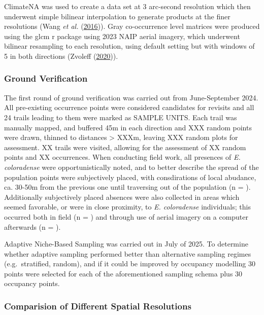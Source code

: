 \documentclass[
]{article}
\begin{document}
ClimateNA was used to create a data set at 3 arc-second resolution which
then underwent simple bilinear interpolation to generate products at the
finer resolutions (Wang \emph{et al.}
(\protect\hyperlink{ref-wang2016locally}{2016})). Gray co-occurrence
level matrices were produced using the glcm r package using 2023 NAIP
aerial imagery, which underwent bilinear resampling to each resolution,
using default setting but with windows of 5 in both directions (Zvoleff
(\protect\hyperlink{ref-zvoleff2020glcm}{2020})).

\hypertarget{ground-verification}{%
\subsubsection{Ground Verification}\label{ground-verification}}

The first round of ground verification was carried out from
June-September 2024. All pre-existing occurrence points were considered
candidates for revisits and all 24 trails leading to them were marked as
SAMPLE UNITS. Each trail was manually mapped, and buffered 45m in each
direction and XXX random points were drawn, thinned to distances
\textgreater{} XXXm, leaving XXX random plots for assessment. XX trails
were visited, allowing for the assessment of XX random points and XX
occurrences. When conducting field work, all presences of \emph{E.
coloradense} were opportunistically noted, and to better describe the
spread of the population points were subjectively placed, with
consdirations of local abudance, ca. 30-50m from the previous one until
traversing out of the population (n = ). Additionally subjectively
placed absences were also collected in areas which seemed favorable, or
were in close proximity, to \emph{E. coloradense} individuals; this
occurred both in field (n = ) and through use of aerial imagery on a
computer afterwards (n = ).

Adaptive Niche-Based Sampling was carried out in July of 2025. To
determine whether adaptive sampling performed better than alternative
sampling regimes (e.g.~stratified, random), and if it could be improved
by occupancy modelling 30 points were selected for each of the
aforementioned sampling schema plus 30 occupancy points.

\hypertarget{comparision-of-different-spatial-resolutions}{%
\subsubsection{Comparision of Different Spatial
Resolutions}\label{comparision-of-different-spatial-resolutions}}
\end{document}
